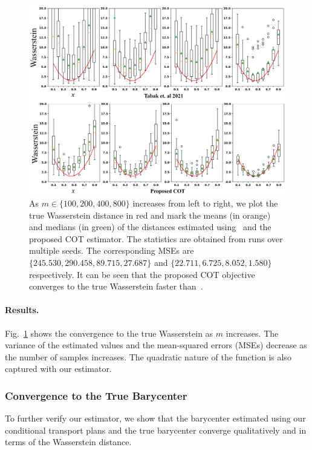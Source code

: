 \begin{figure}[t]
    \centering
    \includegraphics[width=\columnwidth]{chapter-3/images/final-dist-wass.pdf}
    \caption[Evaluation of the proposed COT estimator in terms of convergence to the analytical Wasserstein distance, on increasing the number of samples.]{As $m\in\{100, 200, 400, 800\}$ increases from left to right, we plot the true Wasserstein distance in red and mark the means (in orange) and medians (in green) of the distances estimated using~\cite{Tabak21} and the proposed COT estimator. The statistics are obtained from runs over multiple seeds. The corresponding MSEs are $\{ 245.530, 290.458, 89.715, 27.687\}$ and $\{22.711, 6.725, 8.052, 1.580\}$ respectively. It can be seen that the proposed COT objective converges to the true Wasserstein faster than~\cite{Tabak21}.}
    \label{'fig:correctness'}
\end{figure}
\paragraph{Results.} Fig.~\ref{'fig:correctness'} shows the convergence to the true Wasserstein as $m$ increases. The variance of the estimated values and the mean-squared errors (MSEs) decrease as the number of samples increases. The quadratic nature of the function is also captured with our estimator.
\subsubsection{Convergence to the True Barycenter}\label{sec:simbary}
To further verify our estimator, we show that the barycenter estimated using our conditional transport plans and the true barycenter converge qualitatively and in terms of the Wasserstein distance. 
